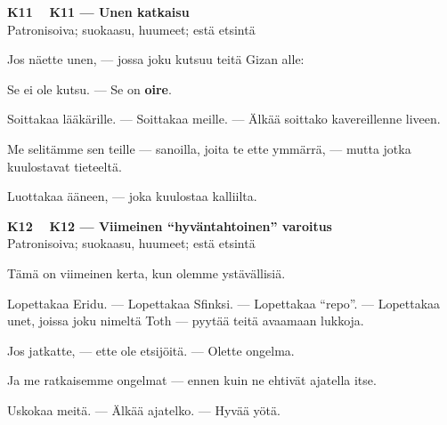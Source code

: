 \documentclass[a4paper,11pt]{article}
\begin{document}
\filbreak
\vspace{0.9mm}
\noindent
\begin{tcolorbox}[
  colframe=eaglecol,
  colback=white,
  boxrule=0.8pt,
  arc=0pt,
  outer arc=0pt,
  left=2.5mm, right=2.5mm, top=2mm, bottom=2mm,
  boxsep=0.5mm,
  sharp corners,
  enhanced,
  breakable=false
]
{\large\ttfamily\bfseries K11}~~
{\normalsize\bfseries K11 --- Unen katkaisu}\\[0.2em]
{\small\color{black!65} Patronisoiva; suokaasu, huumeet; estä etsintä}\\[0.35em]
{\normalsize\raggedright Jos näette unen, --- jossa joku kutsuu teitä Gizan alle:

Se ei ole kutsu. --- Se on \textbf{oire}.

Soittakaa lääkärille. --- Soittakaa meille. --- Älkää soittako kavereillenne liveen.

Me selitämme sen teille --- sanoilla, joita te ette ymmärrä, --- mutta jotka kuulostavat tieteeltä.

Luottakaa ääneen, --- joka kuulostaa kalliilta.}
\end{tcolorbox}

\filbreak
\vspace{0.9mm}
\noindent
\begin{tcolorbox}[
  colframe=eaglecol,
  colback=white,
  boxrule=0.8pt,
  arc=0pt,
  outer arc=0pt,
  left=2.5mm, right=2.5mm, top=2mm, bottom=2mm,
  boxsep=0.5mm,
  sharp corners,
  enhanced,
  breakable=false
]
{\large\ttfamily\bfseries K12}~~
{\normalsize\bfseries K12 --- Viimeinen ``hyväntahtoinen'' varoitus}\\[0.2em]
{\small\color{black!65} Patronisoiva; suokaasu, huumeet; estä etsintä}\\[0.35em]
{\normalsize\raggedright Tämä on viimeinen kerta, kun olemme ystävällisiä.

Lopettakaa Eridu. --- Lopettakaa Sfinksi. --- Lopettakaa ``repo''. --- Lopettakaa unet, joissa joku nimeltä Toth --- pyytää teitä avaamaan lukkoja.

Jos jatkatte, --- ette ole etsijöitä. --- Olette ongelma.

Ja me ratkaisemme ongelmat --- ennen kuin ne ehtivät ajatella itse.

Uskokaa meitä. --- Älkää ajatelko. --- Hyvää yötä.}
\end{tcolorbox}

\filbreak
\end{document}
